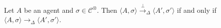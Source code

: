 \documentclass[main.tex]{subfiles}
\begin{document}
%
%

\begin{proposition}\label{cor:true}
Let $A$ be an agent and $\sigma \in \mathcal{C}^\otimes$.
Then $\langle A, \sigma \rangle \xrightarrow{\;  \bot \: }_\Delta \langle A', \sigma' \rangle$
if and only if $\langle A, \sigma\rangle \longrightarrow_\Delta \langle A', \sigma'\rangle$.
\end{proposition}
\end{document}
